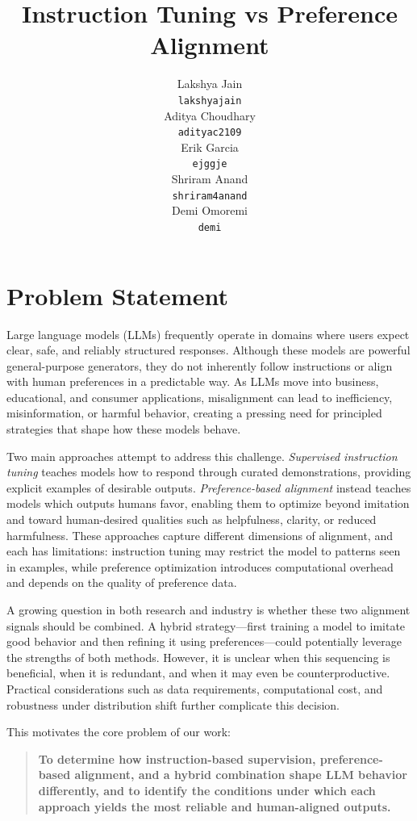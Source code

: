 \documentclass[11pt,a4paper]{article}
\title{Instruction Tuning vs Preference Alignment}
\author{Lakshya Jain \\ {\tt lakshyajain} \\\And
  Aditya Choudhary \\ {\tt adityac2109} \\\And
  Erik Garcia \\ {\tt ejggje} \\\And
  Shriram Anand \\ {\tt shriram4anand} \\\And
  Demi Omoremi \\ {\tt demi} \\
}
\begin{document}
\maketitle

\section{Problem Statement}

Large language models (LLMs) frequently operate in domains where users expect clear, safe, and reliably structured responses. Although these models are powerful general-purpose generators, they do not inherently follow instructions or align with human preferences in a predictable way. As LLMs move into business, educational, and consumer applications, misalignment can lead to inefficiency, misinformation, or harmful behavior, creating a pressing need for principled strategies that shape how these models behave.

Two main approaches attempt to address this challenge. \emph{Supervised instruction tuning} teaches models how to respond through curated demonstrations, providing explicit examples of desirable outputs. \emph{Preference-based alignment} instead teaches models which outputs humans favor, enabling them to optimize beyond imitation and toward human-desired qualities such as helpfulness, clarity, or reduced harmfulness. These approaches capture different dimensions of alignment, and each has limitations: instruction tuning may restrict the model to patterns seen in examples, while preference optimization introduces computational overhead and depends on the quality of preference data.

A growing question in both research and industry is whether these two alignment signals should be combined. A hybrid strategy—first training a model to imitate good behavior and then refining it using preferences—could potentially leverage the strengths of both methods. However, it is unclear when this sequencing is beneficial, when it is redundant, and when it may even be counterproductive. Practical considerations such as data requirements, computational cost, and robustness under distribution shift further complicate this decision.

This motivates the core problem of our work: \\

\begin{quote}
\centering
\textbf{To determine how instruction-based supervision, preference-based alignment, and a hybrid combination shape LLM behavior differently, and to identify the conditions under which each approach yields the most reliable and human-aligned outputs.}
\end{quote}
\end{document}
